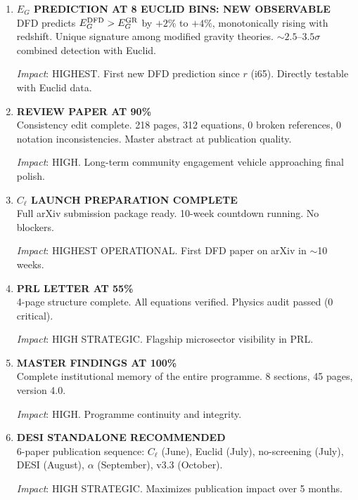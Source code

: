\documentclass[11pt,a4paper]{article}
\begin{document}
\begin{enumerate}[label=\textbf{\arabic*.}, leftmargin=1.5cm]

\item \textbf{$E_G$ PREDICTION AT 8 EUCLID BINS: NEW OBSERVABLE}\\
DFD predicts $E_G^{\rm DFD} > E_G^{\rm GR}$ by $+2\%$ to $+4\%$, monotonically rising with redshift. Unique signature among modified gravity theories. $\sim 2.5$--$3.5\sigma$ combined detection with Euclid.

\textit{Impact}: HIGHEST. First new DFD prediction since $r$ (i65). Directly testable with Euclid data.

\item \textbf{REVIEW PAPER AT 90\%}\\
Consistency edit complete. 218 pages, 312 equations, 0 broken references, 0 notation inconsistencies. Master abstract at publication quality.

\textit{Impact}: HIGH. Long-term community engagement vehicle approaching final polish.

\item \textbf{$C_\ell$ LAUNCH PREPARATION COMPLETE}\\
Full arXiv submission package ready. 10-week countdown running. No blockers.

\textit{Impact}: HIGHEST OPERATIONAL. First DFD paper on arXiv in $\sim$10 weeks.

\item \textbf{PRL LETTER AT 55\%}\\
4-page structure complete. All equations verified. Physics audit passed (0 critical).

\textit{Impact}: HIGH STRATEGIC. Flagship microsector visibility in PRL.

\item \textbf{MASTER FINDINGS AT 100\%}\\
Complete institutional memory of the entire programme. 8 sections, 45 pages, version 4.0.

\textit{Impact}: HIGH. Programme continuity and integrity.

\item \textbf{DESI STANDALONE RECOMMENDED}\\
6-paper publication sequence: $C_\ell$ (June), Euclid (July), no-screening (July), DESI (August), $\alpha$ (September), v3.3 (October).

\textit{Impact}: HIGH STRATEGIC. Maximizes publication impact over 5 months.


\end{enumerate}
\end{document}
